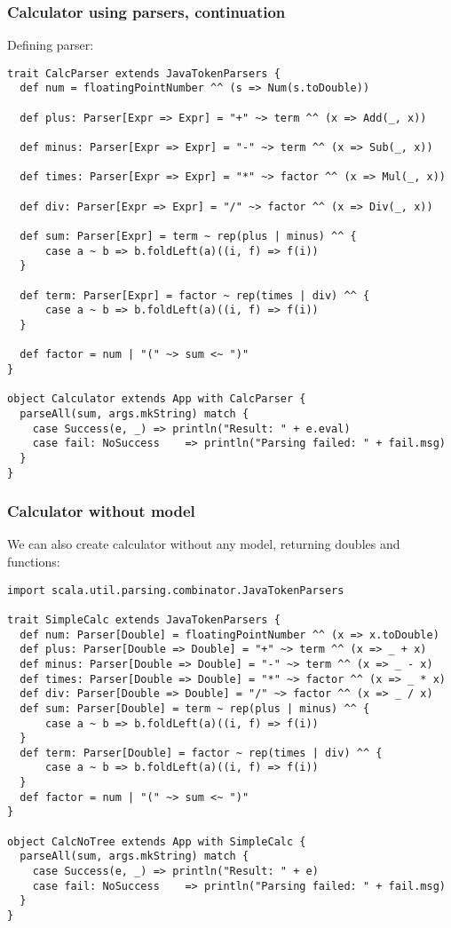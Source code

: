 \documentclass[t]{beamer}
\begin{document}
\begin{frame}[fragile]
\frametitle{Calculator using parsers, continuation}
Defining parser:
\begin{lstlisting}[name=calc]
trait CalcParser extends JavaTokenParsers {
  def num = floatingPointNumber ^^ (s => Num(s.toDouble))

  def plus: Parser[Expr => Expr] = "+" ~> term ^^ (x => Add(_, x))

  def minus: Parser[Expr => Expr] = "-" ~> term ^^ (x => Sub(_, x))

  def times: Parser[Expr => Expr] = "*" ~> factor ^^ (x => Mul(_, x))

  def div: Parser[Expr => Expr] = "/" ~> factor ^^ (x => Div(_, x))

  def sum: Parser[Expr] = term ~ rep(plus | minus) ^^ {
      case a ~ b => b.foldLeft(a)((i, f) => f(i))
  }

  def term: Parser[Expr] = factor ~ rep(times | div) ^^ {
      case a ~ b => b.foldLeft(a)((i, f) => f(i))
  }

  def factor = num | "(" ~> sum <~ ")"
}

object Calculator extends App with CalcParser {
  parseAll(sum, args.mkString) match {
    case Success(e, _) => println("Result: " + e.eval)
    case fail: NoSuccess    => println("Parsing failed: " + fail.msg)
  }
}
\end{lstlisting}
\end{frame}

\begin{frame}[fragile]
\frametitle{Calculator without model}

We can also create calculator without any model, returning doubles and functions:

\begin{lstlisting}
import scala.util.parsing.combinator.JavaTokenParsers

trait SimpleCalc extends JavaTokenParsers {
  def num: Parser[Double] = floatingPointNumber ^^ (x => x.toDouble)
  def plus: Parser[Double => Double] = "+" ~> term ^^ (x => _ + x)
  def minus: Parser[Double => Double] = "-" ~> term ^^ (x => _ - x)
  def times: Parser[Double => Double] = "*" ~> factor ^^ (x => _ * x)
  def div: Parser[Double => Double] = "/" ~> factor ^^ (x => _ / x)
  def sum: Parser[Double] = term ~ rep(plus | minus) ^^ {
      case a ~ b => b.foldLeft(a)((i, f) => f(i))
  }
  def term: Parser[Double] = factor ~ rep(times | div) ^^ {
      case a ~ b => b.foldLeft(a)((i, f) => f(i))
  }
  def factor = num | "(" ~> sum <~ ")"
}

object CalcNoTree extends App with SimpleCalc {
  parseAll(sum, args.mkString) match {
    case Success(e, _) => println("Result: " + e)
    case fail: NoSuccess    => println("Parsing failed: " + fail.msg)
  }
}
\end{lstlisting}
\end{frame}
\end{document}
